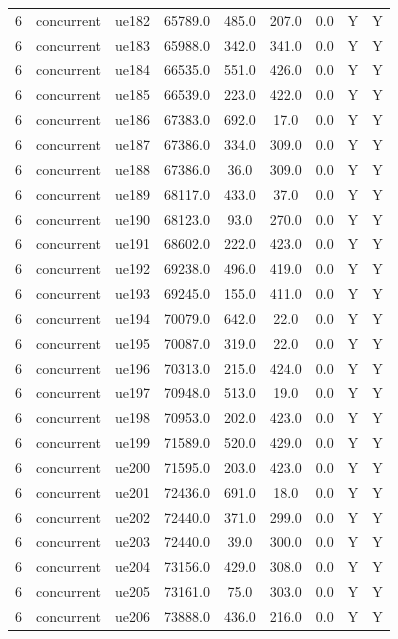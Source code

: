 \begin{table}[ht]
\begin{tabular}{|c|c|c|c|c|c|c|c|c|}
6 & concurrent & ue182 & 65789.0 & 485.0 & 207.0 & 0.0 & Y & Y \\
6 & concurrent & ue183 & 65988.0 & 342.0 & 341.0 & 0.0 & Y & Y \\
6 & concurrent & ue184 & 66535.0 & 551.0 & 426.0 & 0.0 & Y & Y \\
6 & concurrent & ue185 & 66539.0 & 223.0 & 422.0 & 0.0 & Y & Y \\
6 & concurrent & ue186 & 67383.0 & 692.0 & 17.0 & 0.0 & Y & Y \\
6 & concurrent & ue187 & 67386.0 & 334.0 & 309.0 & 0.0 & Y & Y \\
6 & concurrent & ue188 & 67386.0 & 36.0 & 309.0 & 0.0 & Y & Y \\
6 & concurrent & ue189 & 68117.0 & 433.0 & 37.0 & 0.0 & Y & Y \\
6 & concurrent & ue190 & 68123.0 & 93.0 & 270.0 & 0.0 & Y & Y \\
6 & concurrent & ue191 & 68602.0 & 222.0 & 423.0 & 0.0 & Y & Y \\
6 & concurrent & ue192 & 69238.0 & 496.0 & 419.0 & 0.0 & Y & Y \\
6 & concurrent & ue193 & 69245.0 & 155.0 & 411.0 & 0.0 & Y & Y \\
6 & concurrent & ue194 & 70079.0 & 642.0 & 22.0 & 0.0 & Y & Y \\
6 & concurrent & ue195 & 70087.0 & 319.0 & 22.0 & 0.0 & Y & Y \\
6 & concurrent & ue196 & 70313.0 & 215.0 & 424.0 & 0.0 & Y & Y \\
6 & concurrent & ue197 & 70948.0 & 513.0 & 19.0 & 0.0 & Y & Y \\
6 & concurrent & ue198 & 70953.0 & 202.0 & 423.0 & 0.0 & Y & Y \\
6 & concurrent & ue199 & 71589.0 & 520.0 & 429.0 & 0.0 & Y & Y \\
6 & concurrent & ue200 & 71595.0 & 203.0 & 423.0 & 0.0 & Y & Y \\
6 & concurrent & ue201 & 72436.0 & 691.0 & 18.0 & 0.0 & Y & Y \\
6 & concurrent & ue202 & 72440.0 & 371.0 & 299.0 & 0.0 & Y & Y \\
6 & concurrent & ue203 & 72440.0 & 39.0 & 300.0 & 0.0 & Y & Y \\
6 & concurrent & ue204 & 73156.0 & 429.0 & 308.0 & 0.0 & Y & Y \\
6 & concurrent & ue205 & 73161.0 & 75.0 & 303.0 & 0.0 & Y & Y \\
6 & concurrent & ue206 & 73888.0 & 436.0 & 216.0 & 0.0 & Y & Y \\

\end{tabular}
\end{table}
